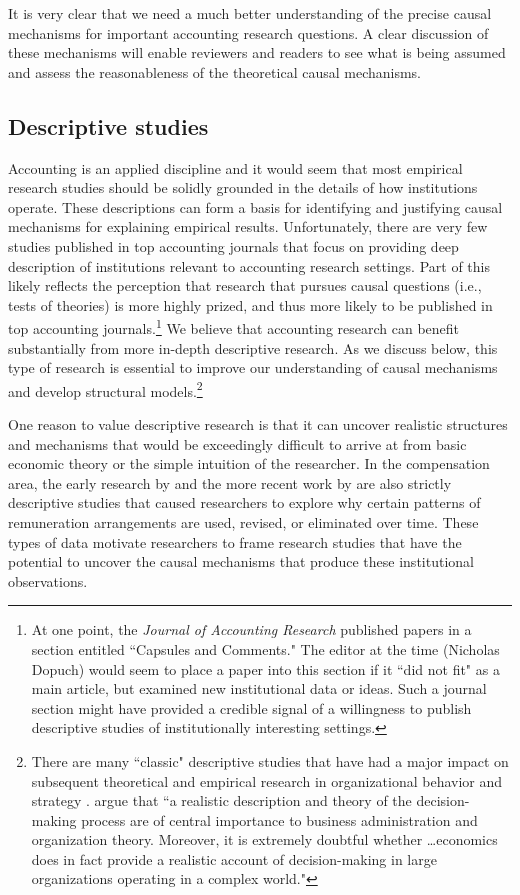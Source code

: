 \documentclass[12pt,reqno,titlepage]{amsart}
\begin{document}
\begin{doublespace}
It is very clear that we need a much better understanding of the precise causal mechanisms for important accounting research questions.
A clear discussion of these mechanisms will enable reviewers and readers to see what is being assumed and assess the reasonableness of the theoretical causal mechanisms.

\subsection{Descriptive studies} \label{sec:desc}

Accounting is an applied discipline and it would seem that most empirical research studies should be solidly grounded in the details of how institutions operate.
These descriptions can form a basis for identifying and justifying causal mechanisms for explaining empirical results.
Unfortunately, there are very few studies published in top accounting journals that focus on providing deep description of institutions relevant to accounting research settings.
Part of this likely reflects the perception that research that pursues causal questions (i.e., tests of theories) is more highly prized, and thus more likely to be published in top accounting journals.\footnote{
At one point, the \emph{Journal of Accounting Research} published papers in a section entitled ``Capsules and Comments."
The editor at the time (Nicholas Dopuch) would seem to place a paper into this section if it ``did not fit" as a main article, but examined new institutional data or ideas. 
Such a journal section might have provided a credible signal of a willingness to publish descriptive studies of institutionally interesting settings.}
We believe that accounting research can benefit substantially from more in-depth descriptive research.
As we discuss below, this type of research is essential to improve our understanding of causal mechanisms and develop structural models.\footnote{
There are many ``classic" descriptive studies that have had a major impact on subsequent theoretical and empirical research in organizational behavior and strategy \citep[e.g.,][]{Cyert:1956fd,Bower:1986vd,Mintzberg1973nature}.
\citet{Cyert:1956fd} argue that ``a realistic description and theory of the decision-making process are of central importance to business administration and organization theory. Moreover, it is extremely doubtful whether \dots economics does in fact provide a realistic account of decision-making in large organizations operating in a complex world."}

One reason to value descriptive research is that it can uncover realistic structures and mechanisms that would be exceedingly difficult to arrive at from basic economic theory or the simple intuition of the researcher.
In the compensation area, the early research by \citet{Lewellyn:1968aa} and the more recent work by \citet{Frydman:2010bc} are also strictly descriptive studies that caused researchers to explore why certain patterns of remuneration arrangements are used, revised, or eliminated over time.
These types of data motivate researchers to frame research studies that have the potential to uncover the causal mechanisms that produce these institutional observations.


\end{doublespace}
\end{document}
